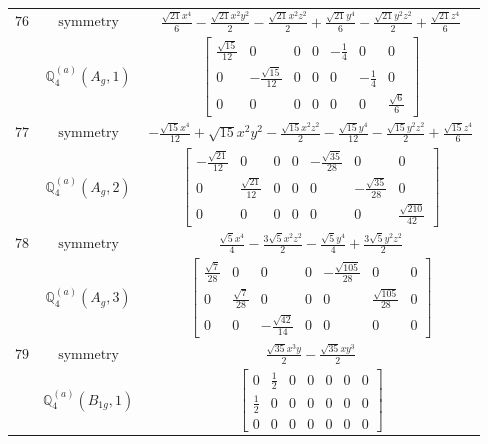 \documentclass[fleqn,8pt,landscape]{jsarticle}
\begin{document}
\begin{longtable}{ccc}
$ 76 $ & $ \text{symmetry} $ & $ \frac{\sqrt{21} x^{4}}{6} - \frac{\sqrt{21} x^{2} y^{2}}{2} - \frac{\sqrt{21} x^{2} z^{2}}{2} + \frac{\sqrt{21} y^{4}}{6} - \frac{\sqrt{21} y^{2} z^{2}}{2} + \frac{\sqrt{21} z^{4}}{6} $ \\
$  $ & $ \mathbb{Q}_{4}^{(a)}(A_{g},1) $ & $ \begin{bmatrix} \frac{\sqrt{15}}{12} & 0 & 0 & 0 & - \frac{1}{4} & 0 & 0 \\ 0 & - \frac{\sqrt{15}}{12} & 0 & 0 & 0 & - \frac{1}{4} & 0 \\ 0 & 0 & 0 & 0 & 0 & 0 & \frac{\sqrt{6}}{6} \end{bmatrix} $ \\ \hline
$ 77 $ & $ \text{symmetry} $ & $ - \frac{\sqrt{15} x^{4}}{12} + \sqrt{15} x^{2} y^{2} - \frac{\sqrt{15} x^{2} z^{2}}{2} - \frac{\sqrt{15} y^{4}}{12} - \frac{\sqrt{15} y^{2} z^{2}}{2} + \frac{\sqrt{15} z^{4}}{6} $ \\
$  $ & $ \mathbb{Q}_{4}^{(a)}(A_{g},2) $ & $ \begin{bmatrix} - \frac{\sqrt{21}}{12} & 0 & 0 & 0 & - \frac{\sqrt{35}}{28} & 0 & 0 \\ 0 & \frac{\sqrt{21}}{12} & 0 & 0 & 0 & - \frac{\sqrt{35}}{28} & 0 \\ 0 & 0 & 0 & 0 & 0 & 0 & \frac{\sqrt{210}}{42} \end{bmatrix} $ \\ \hline
$ 78 $ & $ \text{symmetry} $ & $ \frac{\sqrt{5} x^{4}}{4} - \frac{3 \sqrt{5} x^{2} z^{2}}{2} - \frac{\sqrt{5} y^{4}}{4} + \frac{3 \sqrt{5} y^{2} z^{2}}{2} $ \\
$  $ & $ \mathbb{Q}_{4}^{(a)}(A_{g},3) $ & $ \begin{bmatrix} \frac{\sqrt{7}}{28} & 0 & 0 & 0 & - \frac{\sqrt{105}}{28} & 0 & 0 \\ 0 & \frac{\sqrt{7}}{28} & 0 & 0 & 0 & \frac{\sqrt{105}}{28} & 0 \\ 0 & 0 & - \frac{\sqrt{42}}{14} & 0 & 0 & 0 & 0 \end{bmatrix} $ \\ \hline
$ 79 $ & $ \text{symmetry} $ & $ \frac{\sqrt{35} x^{3} y}{2} - \frac{\sqrt{35} x y^{3}}{2} $ \\
$  $ & $ \mathbb{Q}_{4}^{(a)}(B_{1g},1) $ & $ \begin{bmatrix} 0 & \frac{1}{2} & 0 & 0 & 0 & 0 & 0 \\ \frac{1}{2} & 0 & 0 & 0 & 0 & 0 & 0 \\ 0 & 0 & 0 & 0 & 0 & 0 & 0 \end{bmatrix} $ \\ \hline

\end{longtable}
\end{document}
